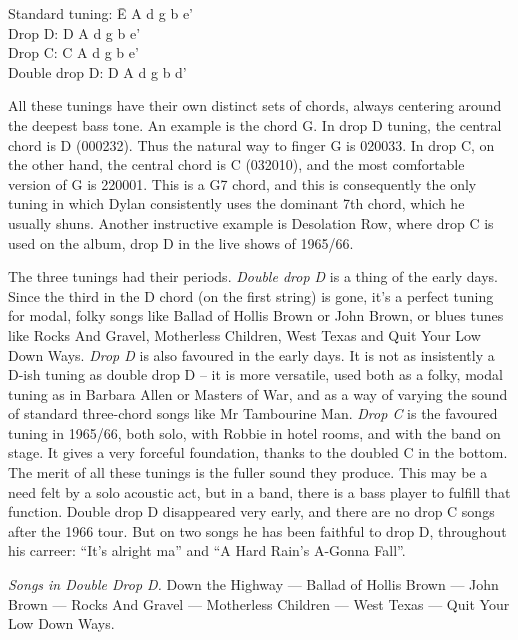 \begin{articlelayout}
\begin{tabbing}
Standard tuning: \= E A d g b e'\\
Drop D:          \> D A d g b e'\\
Drop C:          \> C A d g b e'\\
Double drop D:   \> D A d g b d'\\
\end{tabbing}

All these tunings have their own distinct sets of chords, always
centering around the deepest bass tone. An example is the chord G. In
drop D tuning, the central chord is D (000232). Thus the natural way
to finger G is 020033. In drop C, on the other hand, the central chord
is C (032010), and the most comfortable version of G is 220001. This
is a G7 chord, and this is consequently the only tuning in which Dylan
consistently uses the dominant 7th chord, which he usually
shuns. Another instructive example is Desolation Row, where drop C is
used on the album, drop D in the live shows of 1965/66.

The three tunings had their periods. \emph{Double drop D} is a thing
of the early days. Since the third in the D chord (on the first
string) is gone, it's a perfect tuning for modal, folky songs like
Ballad of Hollis Brown or John Brown, or blues tunes like Rocks And
Gravel, Motherless Children, West Texas and Quit Your Low Down
Ways. \emph{Drop D} is also favoured in the early days. It is not as
insistently a D-ish tuning as double drop D -- it is more versatile,
used both as a folky, modal tuning as in Barbara Allen or Masters of
War, and as a way of varying the sound of standard three-chord songs
like Mr Tambourine Man. \emph{Drop C} is the favoured tuning in
1965/66, both solo, with Robbie in hotel rooms, and with the band on
stage. It gives a very forceful foundation, thanks to the doubled C in
the bottom. \\ The merit of all these tunings is the fuller sound they
produce. This may be a need felt by a solo acoustic act, but in a
band, there is a bass player to fulfill that function. Double drop D
disappeared very early, and there are no drop C songs after the 1966
tour. But on two songs he has been faithful to drop D, throughout his
carreer: ``It's alright ma'' and ``A Hard Rain's A-Gonna
Fall''.

\emph{Songs in Double Drop D.} Down the Highway --- Ballad of Hollis
Brown --- John Brown --- Rocks And Gravel --- Motherless Children ---
West Texas --- Quit Your Low Down Ways.


\end{articlelayout}
